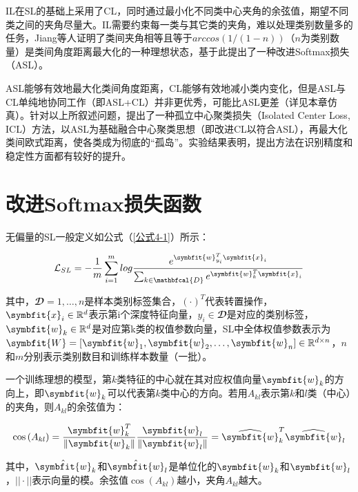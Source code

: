 IL在SL的基础上采用了CL，同时通过最小化不同类中心夹角的余弦值，期望不同类之间的夹角尽量大。IL需要约束每一类与其它类的夹角，难以处理类别数量多的任务，Jiang等人\cite{66}证明了类间夹角相等且等于$arccos{\left(1/\left(1-n\right)\right)}$（$n$为类别数量）是类间角度距离最大化的一种理想状态，基于此提出了一种改进Softmax损失（ASL）。

ASL能够有效地最大化类间角度距离，CL能够有效地减小类内变化，但是ASL与CL单纯地协同工作（即ASL+CL）并非更优秀，可能比ASL更差（详见本章仿真）。针对以上所叙述问题，提出了一种孤立中心聚类损失（Isolated Center Loss, ICL）方法\cite{71}，以ASL为基础融合中心聚类思想（即改进CL以符合ASL），再最大化类间欧式距离，使各类成为彻底的“孤岛”。实验结果表明，提出方法在识别精度和稳定性方面都有较好的提升。

\section{改进Softmax损失函数}

无偏量的SL一般定义如公式（\ref{公式4-1}）所示：

\begin{equation}\label{公式4-1}
	\mathcal{L}_{SL}=-\frac{1}{m}\sum_{i=1}^{m}{log\frac{e^{\symbfit{w}_{y_i}^T\symbfit{x}_i}}{\sum_{k\in\mathbfcal{D}} e^{\symbfit{w}_k^T\symbfit{x}_i}}}
\end{equation}


其中，$\mathbfcal{D}={1,\ldots,n}$是样本类别标签集合，$\left(\cdot\right)^T$代表转置操作，$\symbfit{x}_i\in\mathbb{R}^d$表示第i个深度特征向量，$y_i\in\mathbfcal{D}$是对应的类别标签，$\symbfit{w}_k\in\mathbb{R}^d$是对应第k类的权值参数向量，SL中全体权值参数表示为$\symbfit{W}=\left[\symbfit{w}_1,\symbfit{w}_2,\ldots,\symbfit{w}_n\right]\in\mathbb{R}^{d\times n}$，$n$和$m$分别表示类别数目和训练样本数量（一批）。

一个训练理想的模型，第$k$类特征的中心就在其对应权值向量$\symbfit{w}_k$的方向上，即$\symbfit{w}_k$可以代表第$k$类中心的方向。若用$A_{kl}$表示第$k$和$l$类（中心）的夹角，则$A_{kl}$的余弦值为：

\begin{equation}\label{公式4-2}
	\cos \left(A_{k l}\right)=\frac{\symbfit{w}_{k}^{T}}{\left\|\symbfit{w}_{k}\right\|} \frac{\symbfit{w}_{l}}{\left\|\symbfit{w}_{l}\right\|}=\widehat{\symbfit{w}}_{k}^{T} \widehat{\symbfit{w}}_{l}
\end{equation}

其中，${\hat{\symbfit{w}}}_k$和${\hat{\symbfit{w}}}_l$是单位化的$\symbfit{w}_k$和$\symbfit{w}_l$，$||·||$表示向量的模。余弦值$\cos{\left(A_{kl}\right)}$越小，夹角$A_{kl}$越大。

